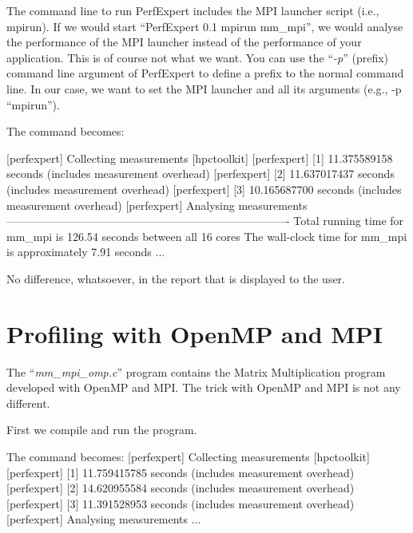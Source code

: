 \begin{prompt}
\end{prompt}

The command line to run PerfExpert includes the MPI launcher script (i.e., mpirun). If we would start ``PerfExpert 0.1 mpirun mm\_mpi'', we would analyse the performance of the MPI launcher instead of the performance of your application. This is of course not what we want. You can use the ``\textit{-p}'' (prefix) command line argument of PerfExpert to define a prefix to the normal command line. In our case, we want to set the MPI launcher and all its arguments (e.g., -p
``mpirun'').

The command becomes:

\begin{prompt}
[perfexpert] Collecting measurements [hpctoolkit]
[perfexpert]    [1] 11.375589158 seconds (includes measurement overhead)
[perfexpert]    [2] 11.637017437 seconds (includes measurement overhead)
[perfexpert]    [3] 10.165687700 seconds (includes measurement overhead)
[perfexpert] Analysing measurements
----------------------------------------------------------------------------
Total running time for mm_mpi is 126.54 seconds between all 16 cores
The wall-clock time for mm_mpi is approximately 7.91 seconds
...
\end{prompt}

No difference, whatsoever, in the report that is displayed to the user.

\section{Profiling with OpenMP and MPI}
\label{sec:Profiling_with_OpenMP_MPI}

The ``\textit{mm\_mpi\_omp.c}'' program contains the Matrix Multiplication program developed with OpenMP and MPI. The trick with OpenMP and MPI is not any different.

First we compile and run the program.

\begin{prompt}
The command becomes:
[perfexpert] Collecting measurements [hpctoolkit]
[perfexpert]    [1] 11.759415785 seconds (includes measurement overhead)
[perfexpert]    [2] 14.620955584 seconds (includes measurement overhead)
[perfexpert]    [3] 11.391528953 seconds (includes measurement overhead)
[perfexpert] Analysing measurements
...
\end{prompt}

